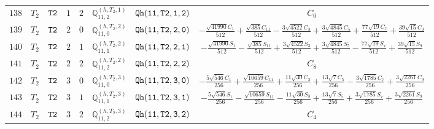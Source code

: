 \documentclass[fleqn,8pt]{jsarticle}
\begin{document}
\begin{table}[ht!]
\begin{center}
\begin{tabular}{cccccccc}
$ 138 $ & $ T_{2} $ & $ {\tt T2} $ & $ 1 $ & $ 2 $ & $ \mathbb{Q}_{11,2}^{(h,T_{2},1)} $ & $ {\tt Qh(11,T2,1,2)} $ & $ C_{0} $ \\
$ 139 $ & $ T_{2} $ & $ {\tt T2} $ & $ 2 $ & $ 0 $ & $ \mathbb{Q}_{11,0}^{(h,T_{2},2)} $ & $ {\tt Qh(11,T2,2,0)} $ & $ - \frac{\sqrt{41990} C_{1}}{512} + \frac{\sqrt{385} C_{11}}{512} - \frac{3 \sqrt{4522} C_{3}}{512} + \frac{3 \sqrt{4845} C_{5}}{512} + \frac{77 \sqrt{19} C_{7}}{512} + \frac{39 \sqrt{15} C_{9}}{512} $ \\
$ 140 $ & $ T_{2} $ & $ {\tt T2} $ & $ 2 $ & $ 1 $ & $ \mathbb{Q}_{11,1}^{(h,T_{2},2)} $ & $ {\tt Qh(11,T2,2,1)} $ & $ - \frac{\sqrt{41990} S_{1}}{512} - \frac{\sqrt{385} S_{11}}{512} + \frac{3 \sqrt{4522} S_{3}}{512} + \frac{3 \sqrt{4845} S_{5}}{512} - \frac{77 \sqrt{19} S_{7}}{512} + \frac{39 \sqrt{15} S_{9}}{512} $ \\
$ 141 $ & $ T_{2} $ & $ {\tt T2} $ & $ 2 $ & $ 2 $ & $ \mathbb{Q}_{11,2}^{(h,T_{2},2)} $ & $ {\tt Qh(11,T2,2,2)} $ & $ C_{8} $ \\
$ 142 $ & $ T_{2} $ & $ {\tt T2} $ & $ 3 $ & $ 0 $ & $ \mathbb{Q}_{11,0}^{(h,T_{2},3)} $ & $ {\tt Qh(11,T2,3,0)} $ & $ - \frac{5 \sqrt{546} C_{1}}{256} + \frac{\sqrt{10659} C_{11}}{256} + \frac{11 \sqrt{30} C_{3}}{256} + \frac{13 \sqrt{7} C_{5}}{256} - \frac{3 \sqrt{1785} C_{7}}{256} + \frac{3 \sqrt{2261} C_{9}}{256} $ \\
$ 143 $ & $ T_{2} $ & $ {\tt T2} $ & $ 3 $ & $ 1 $ & $ \mathbb{Q}_{11,1}^{(h,T_{2},3)} $ & $ {\tt Qh(11,T2,3,1)} $ & $ - \frac{5 \sqrt{546} S_{1}}{256} - \frac{\sqrt{10659} S_{11}}{256} - \frac{11 \sqrt{30} S_{3}}{256} + \frac{13 \sqrt{7} S_{5}}{256} + \frac{3 \sqrt{1785} S_{7}}{256} + \frac{3 \sqrt{2261} S_{9}}{256} $ \\
$ 144 $ & $ T_{2} $ & $ {\tt T2} $ & $ 3 $ & $ 2 $ & $ \mathbb{Q}_{11,2}^{(h,T_{2},3)} $ & $ {\tt Qh(11,T2,3,2)} $ & $ C_{4} $ \\
 \hline \hline
\end{tabular}
\end{center}
\end{table}
\end{document}
